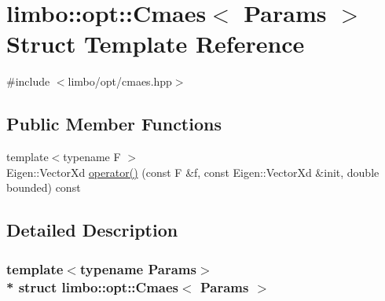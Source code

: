 \hypertarget{structlimbo_1_1opt_1_1_cmaes}{}\section{limbo\+:\+:opt\+:\+:Cmaes$<$ Params $>$ Struct Template Reference}
\label{structlimbo_1_1opt_1_1_cmaes}


{\ttfamily \#include $<$limbo/opt/cmaes.\+hpp$>$}

\subsection*{Public Member Functions}
\begin{DoxyCompactItemize}
\item 
{\footnotesize template$<$typename F $>$ }\\Eigen\+::\+Vector\+Xd \hyperlink{structlimbo_1_1opt_1_1_cmaes_a47ee6970bd2300108c83281ea6fced17}{operator()} (const F \&f, const Eigen\+::\+Vector\+Xd \&init, double bounded) const 
\end{DoxyCompactItemize}


\subsection{Detailed Description}
\subsubsection*{template$<$typename Params$>$\\*
struct limbo\+::opt\+::\+Cmaes$<$ Params $>$}


